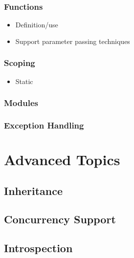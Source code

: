 \documentclass[titlepage,12pt]{article}
\newcommand{\bi}{\begin{itemize}}
\newcommand{\ei}{\end{itemize}}
\begin{document}
\subsubsection{Functions}
\bi
    \item Definition/use
    \item Support parameter passing techniques
\ei

\subsubsection{Scoping}
\bi
    \item Static
\ei

\subsubsection{Modules}

\subsubsection{Exception Handling}


\section{Advanced Topics}

\subsection{Inheritance}
\subsection{Concurrency Support}
\subsection{Introspection}



\end{document}
